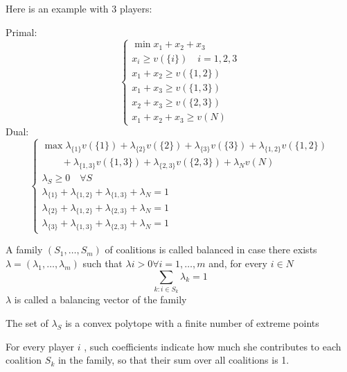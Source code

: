 \documentclass[../main.tex]{subfiles}
\begin{document}
\begin{example}
    Here is an example with 3 players:

    Primal:
    \[
        \begin{cases}
            \min x_1 + x_2 + x_3              \\
            x_i \geq v(\{i\}) \quad i = 1,2,3 \\
            x_1 + x_2 \geq v(\{1,2\})         \\
            x_1 + x_3 \geq v(\{1,3\})         \\
            x_2 + x_3 \geq v(\{2,3\})         \\
            x_1 + x_2 + x_3 \geq v(N)
        \end{cases}
    \]
    Dual:
    \[
        \begin{cases}
            \max \lambda_{\{1\}} v(\{1\}) + \lambda_{\{2\}} v(\{2\}) + \lambda_{\{3\}} v(\{3\}) + \lambda_{\{1,2\}} v(\{1,2\}) \\ \qquad + \lambda_{\{1,3\}} v(\{1,3\}) + \lambda_{\{2,3\}} v(\{2,3\}) + \lambda_N v(N) \\
            \lambda_S \geq 0 \quad \forall S                                                                                   \\
            \lambda_{\{1\}} + \lambda_{\{1,2\}} + \lambda_{\{1,3\}} + \lambda_N = 1                                            \\
            \lambda_{\{2\}} + \lambda_{\{1,2\}} + \lambda_{\{2,3\}} + \lambda_N = 1                                            \\
            \lambda_{\{3\}} + \lambda_{\{1,3\}} + \lambda_{\{2,3\}} + \lambda_N = 1
        \end{cases}
    \]
\end{example}
\begin{definition}
    A family $(S_1, \ldots ,S_m)$ of coalitions is called balanced in case there exists $\lambda= (\lambda_1,\ldots,\lambda_m)$ such that $\lambda i > 0 \forall i = 1,\ldots, m$ and, for every $i \in N$
    \[
        \sum_{k: i \in S_k} \lambda_k = 1
    \]
    $\lambda$ is called a balancing vector of the family
\end{definition}
\begin{note}
    The set of $\lambda_S$ is a convex polytope with a finite number of extreme points
\end{note}
For every player $i$ , such coefficients indicate how much she contributes to each coalition $S_k$ in the family, so that their sum over all coalitions is 1.
\end{document}
